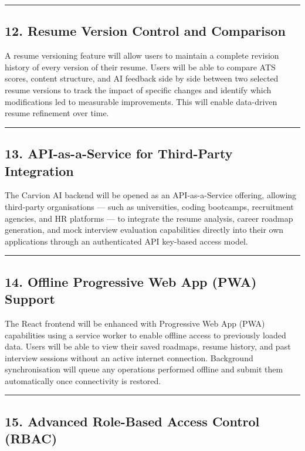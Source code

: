 \documentclass[12pt]{article}
\begin{document}
\noindent\rule{\textwidth}{0.4pt}

\subsection{12. Resume Version Control and Comparison}

A resume versioning feature will allow users to maintain a complete revision history of every version of their resume. Users will be able to compare ATS scores, content structure, and AI feedback side by side between two selected resume versions to track the impact of specific changes and identify which modifications led to measurable improvements. This will enable data-driven resume refinement over time.

\noindent\rule{\textwidth}{0.4pt}

\subsection{13. API-as-a-Service for Third-Party Integration}

The Carvion AI backend will be opened as an API-as-a-Service offering, allowing third-party organisations — such as universities, coding bootcamps, recruitment agencies, and HR platforms — to integrate the resume analysis, career roadmap generation, and mock interview evaluation capabilities directly into their own applications through an authenticated API key-based access model.

\noindent\rule{\textwidth}{0.4pt}

\subsection{14. Offline Progressive Web App (PWA) Support}

The React frontend will be enhanced with Progressive Web App (PWA) capabilities using a service worker to enable offline access to previously loaded data. Users will be able to view their saved roadmaps, resume history, and past interview sessions without an active internet connection. Background synchronisation will queue any operations performed offline and submit them automatically once connectivity is restored.

\noindent\rule{\textwidth}{0.4pt}

\subsection{15. Advanced Role-Based Access Control (RBAC)}
\end{document}
